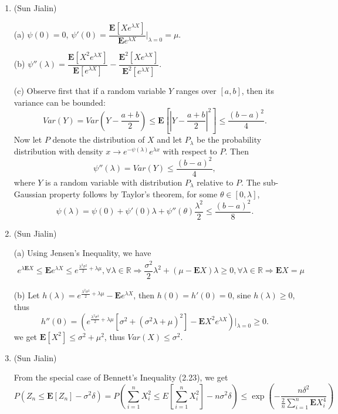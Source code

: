 \begin{enumerate}
	\item
	(Sun Jialin)
	
	(a) $ \psi(0)=0 $, $ \psi'(0)=\dfrac{\bm{E}[Xe^{\lambda X}]}{\bm{E}e^{\lambda X}}|_{\lambda=0}=\mu $.
	
	(b) $ \psi''(\lambda)=\dfrac{\bm{E}[X^{2}e^{\lambda X}]}{\bm{E}[e^{\lambda X}]}-\dfrac{\bm{E}^{2}[Xe^{\lambda X}]}{\bm{E}^{2}[e^{\lambda X}]} $.
	
	
	(c) Observe first that if a random variable $ Y $ ranges over $ [a,b] $, then its variance can be bounded:
	\[ Var(Y)=Var(Y-\dfrac{a+b}{2}) \leq \bm{E}[|Y-\dfrac{a+b}{2}|^{2}] \leq \dfrac{(b-a)^{2}}{4}. \]
	Now let $ P $ denote the distribution of $ X $ and let $ P_{\lambda} $ be the probability distribution with density $ x \to e^{-\psi(\lambda)}e^{\lambda x} $ with respect to $ P $. Then \[ \psi''(\lambda)=Var(Y) \leq \dfrac{(b-a)^{2}}{4} ,\]where $ Y $ is a random variable with distribution $ P_{\lambda} $ relative to $ P $. The sub-Gaussian property follows by Taylor's theorem, for some $ \theta \in [0,\lambda] $, \[ \psi(\lambda)=\psi(0)+\psi'(0)\lambda+\psi''(\theta)\dfrac{\lambda^{2}}{2} \leq \dfrac{(b-a)^{2}}{8}. \]
	
	\item
	(Sun Jialin)
	
	(a) Using Jensen's Inequality, we have \[\begin{split} e^{\lambda \bm{E}X} \leq \bm{E}e^{\lambda X} \leq e^{\frac{\lambda^{2}\sigma^{2}}{2}+\lambda\mu}, \forall \lambda \in \mathbb{R} \Rightarrow \dfrac{\sigma^{2}}{2}\lambda^{2}+(\mu-\bm{E}X)\lambda \geq 0, \forall \lambda \in \mathbb{R} \Rightarrow
	\bm{E}X=\mu \end{split}\]
	
	(b) Let $ h(\lambda)=e^{\frac{\lambda^{2}\sigma^{2}}{2}+\lambda \mu}-\bm{E}e^{\lambda X} $, then $ h(0)=h'(0)=0 $, sine $ h(\lambda) \geq 0 $, thus \[ h''(0)= \left(e^{\frac{\lambda^{2}\sigma^{2}}{2}+\lambda\mu}[\sigma^{2}+(\sigma^{2}\lambda+\mu)^{2}]-\bm{E}X^{2}e^{\lambda X}\right)|_{\lambda=0} \geq 0 . \]  we get $ \bm{E}[X^{2}] \leq \sigma^{2}+\mu^{2} $, thus $ Var(X) \leq \sigma^{2} $.
	
	
	\item
	(Sun Jialin)
	
	From the special case of Bennett's Inequality (2.23), we get \[ P(Z_{n} \leq \bm{E}[Z_{n}]-\sigma^{2}\delta) =
	P(\sum_{i=1}^{n}X^{2}_{i} \leq E[\sum_{i=1}^{n}X^{2}_{i}]-n\sigma^{2}\delta) \leq \exp(-\dfrac{n\delta^{2}}{\frac{2}{n}\sum_{i=1}^{n}\bm{E}X^{4}_{i}}) \]
	

\end{enumerate}
